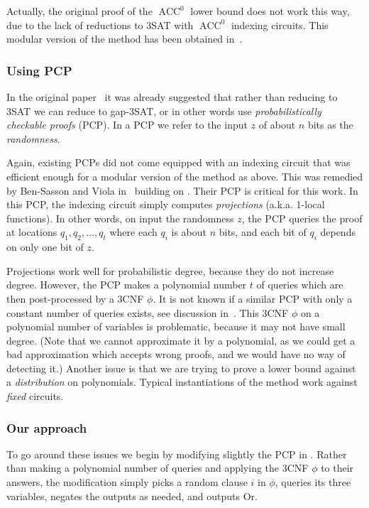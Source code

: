 \documentclass[11pt]{article}
\DeclareMathOperator{\ACC}{\mathrm{ACC}}  %
\begin{document}
Actually, the original proof of the $\ACC^{0}$ lower bound does not
work this way, due to the lack of reductions to 3SAT with $\ACC^{0}$
indexing circuits. This modular version of the method has been obtained
in~\cite{JahanjouMV-explicit}.

\subsubsection{Using PCP}

In the original paper~\cite{Williams13-Improving} it was already
suggested that rather than reducing to 3SAT we can reduce to gap-3SAT,
or in other words use \emph{probabilistically checkable proofs} (PCP).
In a PCP we refer to the input $z$ of about $n$ bits as the \emph{randomness}.

Again, existing PCPs did not come equipped with an indexing circuit
that was efficient enough for a modular version of the method as above.
This was remedied by Ben-Sasson and Viola in~\cite{Ben-SassonV-AC0PCP}
building on \cite{Ben-SassonGHSV05,Ben-SassonS08}. Their PCP is critical
for this work. In this PCP, the indexing circuit simply computes \emph{projections}
(a.k.a. 1-local functions). In other words, on input the randomness
$z$, the PCP queries the proof at locations $q_{1},q_{2},\ldots,q_{t}$
where each $q_{i}$ is about $n$ bits, and each bit of $q_{i}$ depends
on only one bit of $z$.

Projections work well for probabilistic degree, because they do not
increase degree. However, the PCP makes a polynomial number $t$ of
queries which are then post-processed by a 3CNF $\phi$. It is not
known if a similar PCP with only a constant number of queries exists,
see discussion in~\cite{Ben-SassonV-AC0PCP}. This 3CNF $\phi$ on
a polynomial number of variables is problematic, because it may not
have small degree. (Note that we cannot approximate it by a polynomial,
as we could get a bad approximation which accepts wrong proofs, and
we would have no way of detecting it.) Another issue is that we are
trying to prove a lower bound against a \emph{distribution }on polynomials.
Typical instantiations of the method work against \emph{fixed} circuits.

\subsubsection{Our approach}

To go around these issues we begin by modifying slightly the PCP in
\cite{Ben-SassonV-AC0PCP}. Rather than making a polynomial number
of queries and applying the 3CNF $\phi$ to their answers, the modification
simply picks a random clause $i$ in $\phi$, queries its three variables,
negates the outputs as needed, and outputs Or.
\end{document}
